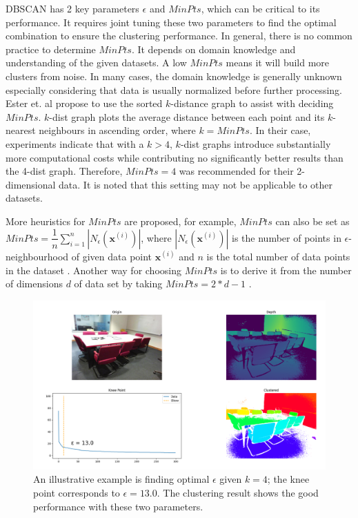 DBSCAN has 2 key parameters $\epsilon$ and $MinPts$, which can be critical to its performance. It requires joint tuning 
these two parameters to find 
the optimal combination to ensure the clustering performance. In general, 
there is no common practice to determine 
$MinPts$. It depends on domain knowledge and understanding of the given datasets. 
A low $MinPts$ means it will build more clusters from noise. In many cases, the 
domain knowledge is generally unknown especially considering that data is usually normalized 
before further processing. Ester et. al 
\cite{ester1996density} propose to use the sorted $k$-distance graph to assist with 
deciding $MinPts$. $k$-dist graph plots the average distance between each point and its $k$-nearest neighbours in ascending order, where $k=MinPts$. In their case, experiments indicate that with a  $k > 4$,  $k$-dist graphs introduce substantially more computational costs while contributing no significantly better results than the 4-dist graph.
Therefore, $MinPts = 4$ was recommended for their 2-dimensional data. It is noted that this setting may not be applicable to other datasets. 


More heuristics for $MinPts$ are proposed, 
for example, $MinPts$ can also be set as $MinPts = 
\dfrac{1}{n}\sum_{i=1}^{n}|N_{\epsilon}(\mathbf{x}^{(i)})|$, where 
$|N_{\epsilon}(\mathbf{x}^{(i)})|$ is the number of points in 
$\epsilon$-neighbourhood of given data point $\mathbf{x}^{(i)}$ and $n$ is the 
total number of data points in the dataset
\cite{sawant2014adaptive}. Another way for choosing $MinPts$ is to derive it 
from the number of dimensions $d$ of data set by taking $MinPts = 2 * d - 1$ 
\cite{sander1998density}. 

\begin{figure}
	\centering
	\label{fig:para}
	\includegraphics[width=\textwidth]{"figures/para.png"}
	\caption{An illustrative example is finding optimal $\epsilon$ given $k = 
	4$; the knee point corresponds to $\epsilon = 13.0$. The clustering result 
	shows the good performance with these two parameters.}
\end{figure}


